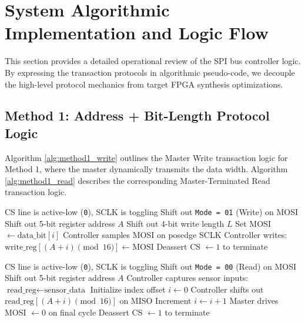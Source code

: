 \documentclass[conference]{IEEEtran}
\begin{document}
\section{System Algorithmic Implementation and Logic Flow}
This section provides a detailed operational review of the SPI bus controller logic. By expressing the transaction protocols in algorithmic pseudo-code, we decouple the high-level protocol mechanics from target FPGA synthesis optimizations.

\subsection{Method 1: Address + Bit-Length Protocol Logic}
Algorithm \ref{alg:method1_write} outlines the Master Write transaction logic for Method 1, where the master dynamically transmits the data width. Algorithm \ref{alg:method1_read} describes the corresponding Master-Terminated Read transaction logic.

\begin{algorithm}[H]
\caption{Method 1 Master Write Transaction}
\label{alg:method1_write}
\begin{algorithmic}[1]
\REQUIRE CS line is active-low (\texttt{0}), SCLK is toggling
\STATE Shift out \texttt{Mode = 01} (Write) on MOSI
\STATE Shift out 5-bit register address $A$
\STATE Shift out 4-bit write length $L$
  \STATE Set MOSI $\leftarrow \text{data\_bit}[i]$
  \STATE Controller samples MOSI on posedge SCLK
  \STATE Controller writes: $\text{write\_reg}[(A + i) \pmod{16}] \leftarrow \text{MOSI}$
\ENDFOR
\STATE Deassert CS $\leftarrow 1$ to terminate
\end{algorithmic}
\end{algorithm}

\begin{algorithm}[H]
\caption{Method 1 Master Read Transaction}
\label{alg:method1_read}
\begin{algorithmic}[1]
\REQUIRE CS line is active-low (\texttt{0}), SCLK is toggling
\STATE Shift out \texttt{Mode = 00} (Read) on MOSI
\STATE Shift out 5-bit register address $A$
\STATE Controller captures sensor inputs: $\text{read\_reg} \leftarrow \text{sensor\_data}$
\STATE Initialize index offset $i \leftarrow 0$
  \STATE Controller shifts out $\text{read\_reg}[(A + i) \pmod{16}]$ on MISO
  \STATE Increment $i \leftarrow i + 1$
\ENDWHILE
\STATE Master drives MOSI $\leftarrow 0$ on final cycle
\STATE Deassert CS $\leftarrow 1$ to terminate
\end{algorithmic}
\end{algorithm}
\end{document}
